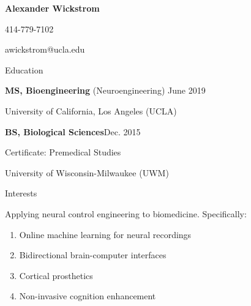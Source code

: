 \documentclass[10pt, oneside]{article}
\begin{document}
	


\centerline{\Large  \textbf{Alexander Wickstrom}}
        \vspace{1mm}
	\centerline{414-779-7102}
  	 \centerline{awickstrom@ucla.edu} 

\begin{cvlist}{Education}
    \item \textbf{MS, Bioengineering} (Neuroengineering) \hfill{June 2019}
    
    \item {University of California, Los Angeles} (UCLA)
	\item \textbf{BS, Biological Sciences}\hfill  Dec. 2015
	\item \quad Certificate: Premedical Studies
	\item {University of Wisconsin-Milwaukee} (UWM)
\end{cvlist}
\vspace{-10mm}
%
%
%
%
%
%
%
%
\begin{cvlist}{Interests}
     \item Applying neural control engineering to biomedicine. Specifically: 
     \begin{enumerate}
        \item Online machine learning for neural recordings
        \item Bidirectional brain-computer interfaces
       \item Cortical prosthetics
        \item Non-invasive cognition enhancement    
     \end{enumerate}
\end{cvlist}
\vspace{-10mm}
\end{document}
